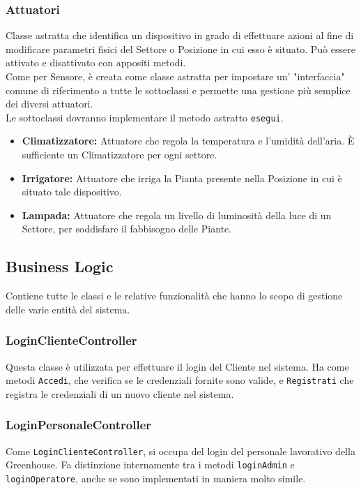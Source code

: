 \documentclass{article}
\newcommand{\code}[1]{\texttt{#1}}
\begin{document}
\subsubsection{Attuatori}
    Classe astratta che identifica un dispositivo in grado di effettuare azioni al fine di modificare parametri fisici del Settore o Posizione in cui esso è situato.
    Può essere attivato e disattivato con appositi metodi.\\
    Come per Sensore, è creata come classe astratta per impostare un' "interfaccia" comune di riferimento a tutte le sottoclassi e permette una gestione più semplice dei diversi attuatori.\\
    Le sottoclassi dovranno implementare il metodo astratto \code{esegui}.
    \begin{itemize}
        \item \textbf{Climatizzatore:}
        Attuatore che regola la temperatura e l'umidità dell'aria. È sufficiente un Climatizzatore per ogni settore.
        \item \textbf{Irrigatore:}
        Attuatore che irriga la Pianta presente nella Posizione in cui è situato tale dispositivo.
        \item \textbf{Lampada:}
        Attuatore che regola un livello di luminosità della luce di un Settore, per soddisfare il fabbisogno delle Piante.
    \end{itemize}

\newpage

\subsection{Business Logic}
\label{subsec:business-logic}
Contiene tutte le classi e le relative funzionalità che hanno lo scopo di gestione delle varie entità del sistema.

\subsubsection{LoginClienteController}
Questa classe è utilizzata per effettuare il login del Cliente nel sistema. Ha come metodi \code{Accedi}, che verifica se le credenziali fornite sono valide, e \code{Registrati} che registra le credenziali di un nuovo cliente nel sistema.

\subsubsection{LoginPersonaleController}
Come \code{LoginClienteController}, si occupa del login del personale lavorativo della Greenhouse. Fa distinzione internamente tra i metodi \code{loginAdmin} e \code{loginOperatore}, anche se sono implementati in maniera molto simile.
\end{document}
